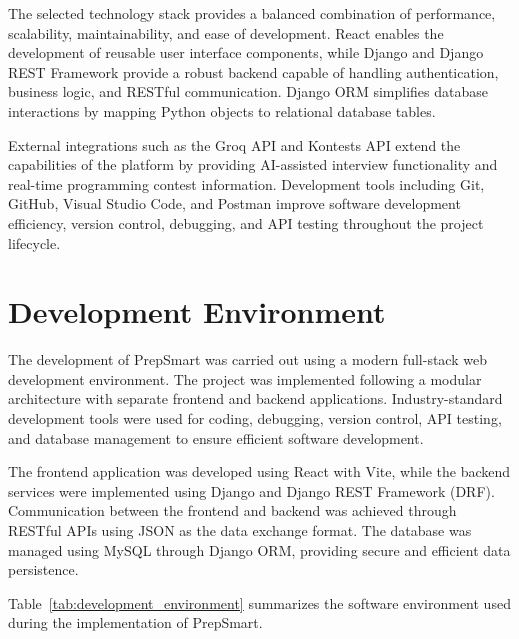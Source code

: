 The selected technology stack provides a balanced combination of performance, scalability, maintainability, and ease of development. React enables the development of reusable user interface components, while Django and Django REST Framework provide a robust backend capable of handling authentication, business logic, and RESTful communication. Django ORM simplifies database interactions by mapping Python objects to relational database tables.

External integrations such as the Groq API and Kontests API extend the capabilities of the platform by providing AI-assisted interview functionality and real-time programming contest information. Development tools including Git, GitHub, Visual Studio Code, and Postman improve software development efficiency, version control, debugging, and API testing throughout the project lifecycle.

\section{Development Environment}

The development of PrepSmart was carried out using a modern full-stack web development environment. The project was implemented following a modular architecture with separate frontend and backend applications. Industry-standard development tools were used for coding, debugging, version control, API testing, and database management to ensure efficient software development.

The frontend application was developed using React with Vite, while the backend services were implemented using Django and Django REST Framework (DRF). Communication between the frontend and backend was achieved through RESTful APIs using JSON as the data exchange format. The database was managed using MySQL through Django ORM, providing secure and efficient data persistence.

Table~\ref{tab:development_environment} summarizes the software environment used during the implementation of PrepSmart.

